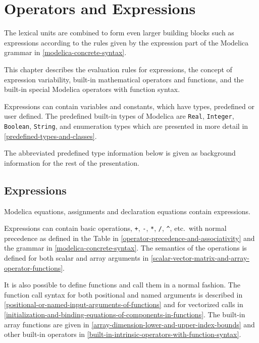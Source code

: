 \chapter{Operators and Expressions}\label{operators-and-expressions}

The lexical units are combined to form even larger building blocks such
as expressions according to the rules given by the expression part of
the Modelica grammar in \cref{modelica-concrete-syntax}.

This chapter describes the evaluation rules for expressions, the concept
of expression variability, built-in mathematical operators and
functions, and the built-in special Modelica operators with function
syntax.

Expressions can contain variables and constants, which have types,
predefined or user defined. The predefined built-in types of Modelica
are \lstinline!Real!, \lstinline!Integer!, \lstinline!Boolean!, \lstinline!String!, and enumeration types which are
presented in more detail in \cref{predefined-types-and-classes}.

\begin{nonnormative}
The abbreviated predefined type information below is given as background information for the rest of the presentation.
\end{nonnormative}

\section{Expressions}\label{expressions}

Modelica equations, assignments and declaration equations contain
expressions.

Expressions can contain basic operations, \lstinline!+!, \lstinline!-!, \lstinline!*!, \lstinline!/!, \lstinline!^!, etc.\ with
normal precedence as defined in the Table in \cref{operator-precedence-and-associativity} and the grammar
in \cref{modelica-concrete-syntax}. The semantics of the operations is defined for both
scalar and array arguments in \cref{scalar-vector-matrix-and-array-operator-functions}.

It is also possible to define functions and call them in a normal
fashion. The function call syntax for both positional and named
arguments is described in \cref{positional-or-named-input-arguments-of-functions} and for vectorized calls in
\cref{initialization-and-binding-equations-of-components-in-functions}. The built-in array functions are given in \cref{array-dimension-lower-and-upper-index-bounds}
and other built-in operators in \cref{built-in-intrinsic-operators-with-function-syntax}.

